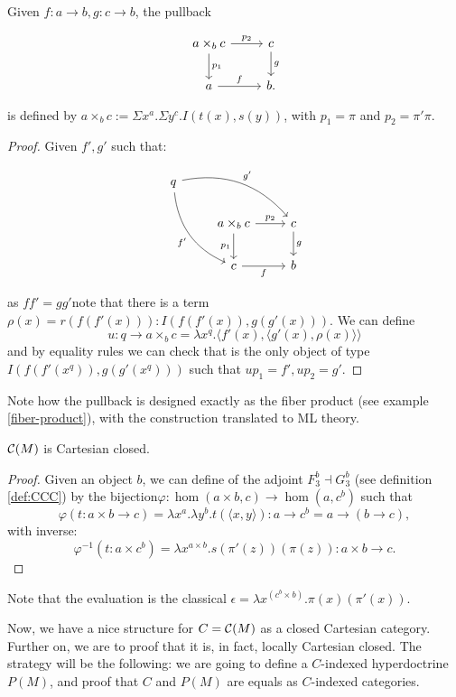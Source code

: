 \begin{proposition}
  Given $f:a\to b, g:c\to b$, the pullback
  \[
    \begin{tikzpicture}
      \node {\begin{tikzcd}
          a\times_b c \ar[d,"p_1"]\ar[r,"p_2"] & c\ar[d,"g"]\\
          a\ar[r,"f"] &   b.
        \end{tikzcd}};
    \end{tikzpicture}
  \]
  is defined by $a\times_b c := \Sigma x^a. \Sigma y^c. I(t(x),s(y))$, with $p_1=\pi$ and $p_2=\pi'\pi$.
\end{proposition}
\begin{proof}
  Given $f',g'$ such that:

  
  \[
    \begin{tikzcd}
      q
      \arrow[bend left]{drr}{g'}
      \arrow[bend right,swap]{ddr}{f'} & & \\
      & a\times_{b}c \arrow{r}{p_2} \arrow{d}[swap]{p_1} & c \arrow{d}{g} \\
      & c \arrow[swap]{r}{f}   & b
    \end{tikzcd}
  \]

  as $ff' = gg'$note that there is a term $\rho(x) = r(f(f'(x))) : I(f(f'(x)), g(g'(x)))$. We can define $$u: q\to a\times_b c = \lambda x^q. \langle f'(x),\langle g'(x),\rho(x)\rangle\rangle$$
  and by equality rules we can check that is the only object of type $I(f(f'(x^q)), g(g'(x^q)))$ such that $up_1 = f',up_2=g'$.
\end{proof}
\begin{remark}
  Note how the pullback is designed exactly as the fiber product (see example \ref{fiber-product}), with the construction translated to ML theory.
\end{remark}

\begin{proposition}\label{prop:CM2}
  $\mathcal{C}(M)$ is Cartesian closed.
\end{proposition}
\begin{proof}
  Given an object $b$, we can define of the adjoint $F_3^b\dashv G_3^b$ (see definition \ref{def:CCC}) by the bijection$\varphi: \hom(a\times b, c) \to \hom(a, c^b)$ such that
  $$\varphi(t:a\times b\to c) = \lambda x^a.\lambda y^b. t(\langle x,y\rangle) : a\to c^b = a\to (b\to c),$$
  with inverse:
  $$\varphi^{-1}(t:a\times c^b) = \lambda x^{a\times b}. s(\pi'(z))(\pi(z)) : a\times b\to c.$$
\end{proof}
\begin{remark}
  Note that the evaluation is the classical $\epsilon  = \lambda x^{(c^b\times b)}.\pi(x)(\pi'(x))$.
\end{remark}
Now, we have a nice structure for $C=\mathcal{C}(M)$ as a closed Cartesian category. Further on, we are to proof that it is, in fact, locally Cartesian closed.  The strategy will be the following:  we are going to define a $C$-indexed hyperdoctrine $P(M)$, and proof that $C$ and $P(M)$ are equals as $C$-indexed categories.

